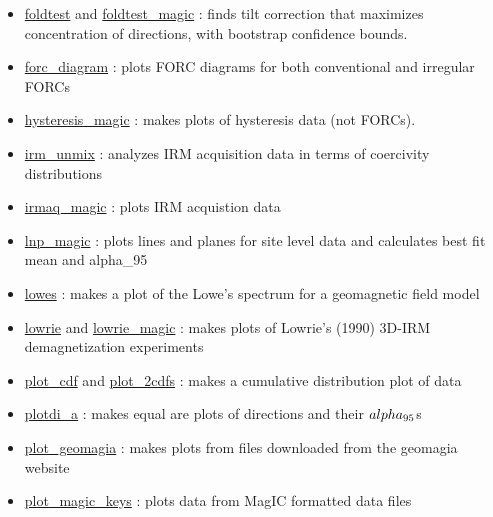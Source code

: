\documentclass[11pt]{book}
\begin{document}
{{\begin{itemize}
\item \href{https://pmagpy.github.io/PmagPy_plots_analysis.html#foldtest}{foldtest} and \href{https://pmagpy.github.io/PmagPy_plots_analysis.html#foldtest_magic}{foldtest\_magic} : finds  tilt correction that maximizes concentration of directions, with bootstrap confidence bounds.
\item \href{https://pmagpy.github.io/PmagPy_plots_analysis.html#forc_diagram}{forc\_diagram} : plots FORC diagrams for both conventional and irregular FORCs
\item \href{https://pmagpy.github.io/PmagPy_plots_analysis.html#hysteresis_magic}{hysteresis\_magic} : makes plots of hysteresis data (not FORCs).
\item \href{https://pmagpy.github.io/PmagPy_plots_analysis.html#irm_unmix}{irm\_unmix} : analyzes IRM acquisition data in terms of coercivity distributions
\item \href{https://pmagpy.github.io/PmagPy_plots_analysis.html#irmaq_magic}{irmaq\_magic} : plots IRM acquistion data
\item \href{https://pmagpy.github.io/PmagPy_plots_analysis.html#lnp_magic}{lnp\_magic} : plots lines and planes for site level data and calculates best fit mean and alpha_95
\item \href{https://pmagpy.github.io/PmagPy_plots_analysis.html#lowes}{lowes} : makes a plot of the Lowe's spectrum for a geomagnetic field model
\item \href{https://pmagpy.github.io/PmagPy_plots_analysis.html#lowrie}{lowrie} and \href{https://pmagpy.github.io/PmagPy_plots_analysis.html#lowrie}{lowrie\_magic} : makes plots of Lowrie's (1990) 3D-IRM demagnetization experiments
\item \href{https://pmagpy.github.io/PmagPy_plots_analysis.html#plot_cdf}{plot\_cdf} and \href{https://pmagpy.github.io/PmagPy_plots_analysis.html#plot_2cdfs}{plot\_2cdfs} : makes a cumulative distribution plot of data
\item \href{https://pmagpy.github.io/PmagPy_plots_analysis.html#plotdi_a}{plotdi\_a} : makes equal are plots of directions and their $\\alpha_{95}$s
\item \href{https://pmagpy.github.io/PmagPy_plots_analysis.html#plot_geomagia}{plot\_geomagia} : makes plots from files downloaded from the  geomagia website
\item \href{https://pmagpy.github.io/PmagPy_plots_analysis.html#plot_magic_keys}{plot\_magic\_keys} : plots data from MagIC formatted data files

\end{itemize}}}
\end{document}
